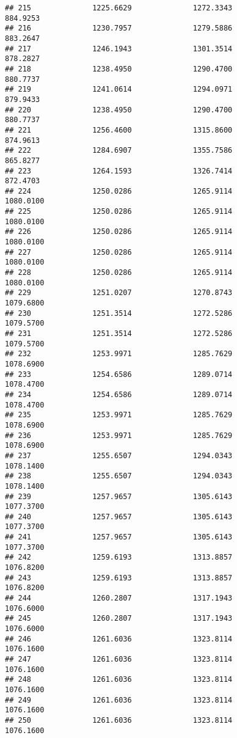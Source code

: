 \documentclass[]{article}
\begin{document}
\begin{verbatim}
## 215              1225.6629              1272.3343            884.9253
## 216              1230.7957              1279.5886            883.2647
## 217              1246.1943              1301.3514            878.2827
## 218              1238.4950              1290.4700            880.7737
## 219              1241.0614              1294.0971            879.9433
## 220              1238.4950              1290.4700            880.7737
## 221              1256.4600              1315.8600            874.9613
## 222              1284.6907              1355.7586            865.8277
## 223              1264.1593              1326.7414            872.4703
## 224              1250.0286              1265.9114           1080.0100
## 225              1250.0286              1265.9114           1080.0100
## 226              1250.0286              1265.9114           1080.0100
## 227              1250.0286              1265.9114           1080.0100
## 228              1250.0286              1265.9114           1080.0100
## 229              1251.0207              1270.8743           1079.6800
## 230              1251.3514              1272.5286           1079.5700
## 231              1251.3514              1272.5286           1079.5700
## 232              1253.9971              1285.7629           1078.6900
## 233              1254.6586              1289.0714           1078.4700
## 234              1254.6586              1289.0714           1078.4700
## 235              1253.9971              1285.7629           1078.6900
## 236              1253.9971              1285.7629           1078.6900
## 237              1255.6507              1294.0343           1078.1400
## 238              1255.6507              1294.0343           1078.1400
## 239              1257.9657              1305.6143           1077.3700
## 240              1257.9657              1305.6143           1077.3700
## 241              1257.9657              1305.6143           1077.3700
## 242              1259.6193              1313.8857           1076.8200
## 243              1259.6193              1313.8857           1076.8200
## 244              1260.2807              1317.1943           1076.6000
## 245              1260.2807              1317.1943           1076.6000
## 246              1261.6036              1323.8114           1076.1600
## 247              1261.6036              1323.8114           1076.1600
## 248              1261.6036              1323.8114           1076.1600
## 249              1261.6036              1323.8114           1076.1600
## 250              1261.6036              1323.8114           1076.1600

\end{verbatim}
\end{document}
